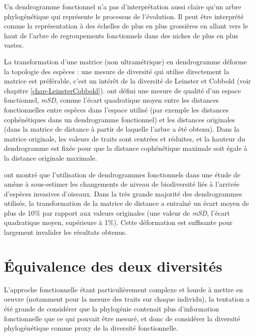 \documentclass[
  11pt,
  french,
  a4paper,
  extrafontsizes,onecolumn,openright
  ]{memoir}
\begin{document}
Un dendrogramme fonctionnel n'a pas d'interprétation aussi claire qu'un arbre phylogénétique qui représente le processus de l'évolution.
Il peut être interprété comme la représentation à des échelles de plus en plus grossières en allant vers le haut de l'arbre de regroupements fonctionnels dans des niches de plus en plus vastes.

La transformation d'une matrice (non ultramétrique) en dendrogramme déforme la topologie des espèces \autocite{Pavoine2005a,Podani2007}: une mesure de diversité qui utilise directement la matrice est préférable, c'est un intérêt de la diversité de Leinster et Cobbold (voir chapitre \ref{chap-LeinsterCobbold}).
\textcite{Maire2015} ont défini une mesure de qualité d'un espace fonctionnel, \emph{mSD}, comme l'écart quadratique moyen entre les distances fonctionnelles entre espèces dans l'espace utilisé (par exemple les distances cophénétiques dans un dendrogramme fonctionnel) et les distances originales (dans la matrice de distance à partir de laquelle l'arbre a été obtenu).
Dans la matrice originale, les valeurs de traits sont centrées et réduites, et la hauteur du dendrogramme est fixée pour que la distance cophénétique maximale soit égale à la distance originale maximale.

\textcite{Villeger2017} ont montré que l'utilisation de dendrogrammes fonctionnels dans une étude de \textcite{Sobral2016} amène à sous-estimer les changements de niveau de biodiversité liés à l'arrivée d'espèces invasives d'oiseaux.
Dans la très grande majorité des dendrogrammes utilisés, la transformation de la matrice de distance a entraîné un écart moyen de plus de 10\% par rapport aux valeurs originales (une valeur de \emph{mSD}, l'écart quadratique moyen, supérieure à 1\%).
Cette déformation est suffisante pour largement invalider les résultats obtenus.

\hypertarget{uxe9quivalence-des-deux-diversituxe9s}{%
\section{Équivalence des deux diversités}\label{uxe9quivalence-des-deux-diversituxe9s}}

L'approche fonctionnelle étant particulièrement complexe et lourde à mettre en oeuvre (notamment pour la mesure des traits sur chaque individu), la tentation a été grande de considérer que la phylogénie contenait plus d'information fonctionnelle que ce qui pouvait être mesuré, et donc de considérer la diversité phylogénétique comme proxy de la diversité fonctionnelle.
\end{document}
